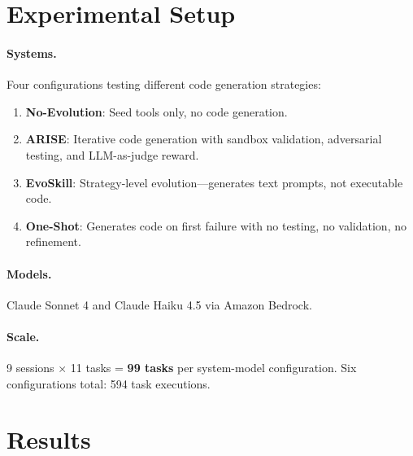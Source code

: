 \documentclass[]{ceurart}
\begin{document}
\section{Experimental Setup}

\paragraph{Systems.} Four configurations testing different code generation strategies:
\begin{enumerate}
\item \textbf{No-Evolution}: Seed tools only, no code generation.
\item \textbf{ARISE}: Iterative code generation with sandbox validation, adversarial testing, and LLM-as-judge reward.
\item \textbf{EvoSkill}: Strategy-level evolution---generates text prompts, not executable code.
\item \textbf{One-Shot}: Generates code on first failure with no testing, no validation, no refinement.
\end{enumerate}

\paragraph{Models.} Claude Sonnet 4 and Claude Haiku 4.5 via Amazon Bedrock.

\paragraph{Scale.} 9 sessions $\times$ 11 tasks = \textbf{99 tasks} per system-model configuration. Six configurations total: 594 task executions.

\section{Results}
\end{document}

